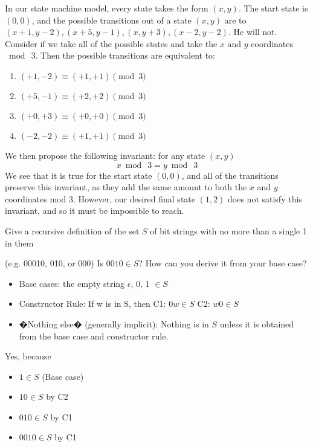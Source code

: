 \documentclass[solution, letterpaper]{cs20}
\begin{document}
\begin{solution}
\subsolution In our state machine model, every state takes the form $(x,y)$. The start state is $(0,0)$, and the possible transitions out of a state $(x,y)$ are to $(x+1, y-2),(x+5,y-1),(x,y+3),(x-2,y-2)$.
\subsolution He will not. Consider if we take all of the possible states and take the $x$ and $y$ coordinates $\bmod\ 3$. Then the possible transitions are equivalent to:
\begin{enumerate}
\item $(+1, -2) \equiv (+1, +1) \pmod{3}$
\item $(+5, -1) \equiv (+2, +2) \pmod{3}$
\item $(+0, +3) \equiv (+0, +0) \pmod{3}$
\item $(-2, -2) \equiv (+1, +1) \pmod{3}$
\end{enumerate}
We then propose the following invariant: for any state $(x,y)$ 
\[x \bmod\ 3 = y \bmod\ 3\]
We see that it is true for the start state $(0,0)$, and all of the transitions preserve this invariant, as they add the same amount to both the $x$ and $y$ coordinates mod 3. However, our desired final state $(1,2)$ does not satisfy this invariant, and so it must be impossible to reach.
\end{solution}

\subproblem Give a recursive definition of the set $S$ of bit strings with no more than a single 1 in them 

(e.g. 00010, 010, or 000)
\subproblem Is $0010\in S$? How can you derive it from your base case?

\begin{solution}
\subsolution
\begin{itemize}
\item Base cases: the empty string $\epsilon$, 0, 1 $\in S$
\item Constructor Rule: If w is in S, then
\subitem C1: $0w\in S$
\subitem C2: $w0\in S$
\item �Nothing else� (generally implicit): Nothing is in $S$ unless it is obtained from the base case and constructor rule.
\end{itemize}
\subsolution Yes, because
\begin{itemize}
\item $1\in S$ (Base case)
\item $10\in S$ by C2 
\item $010\in S$ by C1
\item $0010\in S$ by C1
\end{itemize}
\end{solution}
\end{document}
